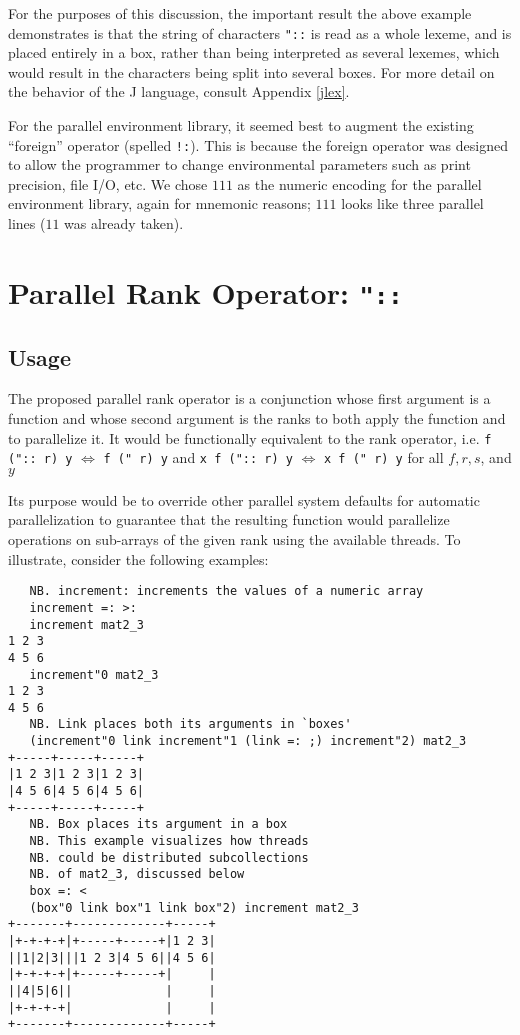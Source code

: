 For the purposes of this discussion, the important result the above example demonstrates 
is that the string of characters \texttt{"::} is read as a whole lexeme, and is placed entirely in a box, 
rather than being interpreted as several lexemes, 
which would result in the characters being split into several boxes.
For more detail on the behavior of the J language, consult Appendix \ref{jlex}. %

For the parallel environment library, 
it seemed best to augment the existing ``\gls{foreign}'' operator (spelled \texttt{!:}).
This is because the foreign operator was designed to 
allow the programmer to change environmental parameters 
such as print precision, file I/O, etc\cite{jvocab}. 
We chose $111$ as the numeric encoding for the parallel environment library, again for mnemonic reasons; 
$111$ looks like three parallel lines ($11$ was already taken).

\section{Parallel Rank Operator: \texttt{"::}}
\label{prank}

\subsection{Usage}
The proposed parallel rank operator is a conjunction 
whose first argument is a function 
and whose second argument is the ranks to both apply the function and to parallelize it. 
It would be functionally equivalent to the rank operator, i.e. 
\texttt{f (":: r) y} $\Leftrightarrow$ \texttt{f (" r) y} and
\texttt{x f (":: r) y} $\Leftrightarrow$ \texttt{x f (" r) y}
for all $f, r, s$, and $y$

Its purpose would be to override other parallel system defaults for automatic parallelization
to guarantee that the resulting function would parallelize operations on sub-arrays of the given rank 
using the available threads.
To illustrate, consider the following examples:
\begin{singlespacing}
\begin{small}
\begin{verbatim}
   NB. increment: increments the values of a numeric array
   increment =: >:
   increment mat2_3
1 2 3
4 5 6
   increment"0 mat2_3
1 2 3
4 5 6
   NB. Link places both its arguments in `boxes'
   (increment"0 link increment"1 (link =: ;) increment"2) mat2_3
+-----+-----+-----+
|1 2 3|1 2 3|1 2 3|
|4 5 6|4 5 6|4 5 6|
+-----+-----+-----+
   NB. Box places its argument in a box
   NB. This example visualizes how threads
   NB. could be distributed subcollections
   NB. of mat2_3, discussed below
   box =: <
   (box"0 link box"1 link box"2) increment mat2_3
+-------+-------------+-----+
|+-+-+-+|+-----+-----+|1 2 3|
||1|2|3|||1 2 3|4 5 6||4 5 6|
|+-+-+-+|+-----+-----+|     |
||4|5|6||             |     |
|+-+-+-+|             |     |
+-------+-------------+-----+
\end{verbatim}
\end{small}
\end{singlespacing}

